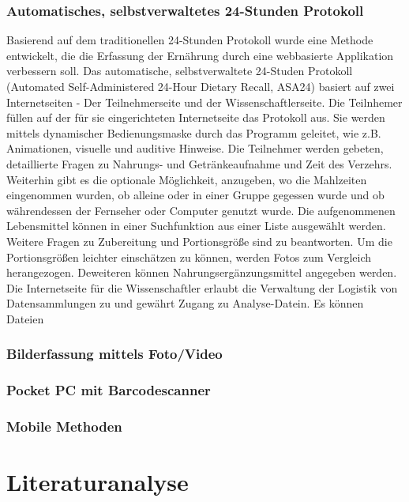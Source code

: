 \subsubsection{Automatisches, selbstverwaltetes 24-Stunden Protokoll}

Basierend auf dem traditionellen 24-Stunden Protokoll wurde eine Methode entwickelt, die die Erfassung der Ernährung durch eine webbasierte Applikation verbessern soll. Das automatische, selbstverwaltete 24-Studen Protokoll (Automated Self-Administered 24-Hour Dietary Recall, ASA24) basiert auf zwei Internetseiten - Der Teilnehmerseite und der Wissenschaftlerseite. Die Teilnhemer füllen auf der für sie eingerichteten Internetseite das Protokoll aus. Sie werden mittels dynamischer Bedienungsmaske durch das Programm geleitet, wie z.B. Animationen, visuelle und auditive Hinweise. Die Teilnehmer werden gebeten, detaillierte Fragen zu Nahrungs- und Getränkeaufnahme und Zeit des Verzehrs. Weiterhin gibt es die optionale Möglichkeit, anzugeben, wo die Mahlzeiten eingenommen wurden, ob alleine oder in einer Gruppe gegessen wurde und ob währendessen der Fernseher oder Computer genutzt wurde. 
Die aufgenommenen Lebensmittel können in einer Suchfunktion aus einer Liste ausgewählt werden. Weitere Fragen zu Zubereitung und Portionsgröße sind zu beantworten. Um die Portionsgrößen leichter einschätzen zu können, werden Fotos zum Vergleich herangezogen. Deweiteren können Nahrungsergänzungsmittel angegeben werden. \\
Die Internetseite für die Wissenschaftler erlaubt die Verwaltung der Logistik von Datensammlungen zu und  gewährt Zugang zu Analyse-Datein. Es können Dateien 





\subsubsection{Bilderfassung mittels Foto/Video}

\subsubsection{Pocket PC mit Barcodescanner}

\subsubsection{Mobile Methoden}

\section{Literaturanalyse}

